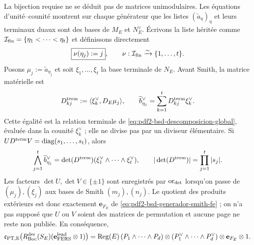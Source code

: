 \begin{proposition}
La bijection requise ne se déduit pas de matrices unimodulaires. Les
équations d'unité--counité montrent sur chaque générateur que les listes
$(\widetilde a_\eta)_\eta$ et leurs terminaux duaux sont des bases de $M_E$ et
$N_E^\vee$. Écrivons la liste héritée comme
$\mathcal I_{\rm fin}=\{\eta_1<\cdots<\eta_t\}$ et définissons directement
\begin{equation}\label{eq:pdf2-bsd-nu-construida}
 \boxed{\nu(\eta_j):=j},
 \qquad
 \nu:\mathcal I_{\rm fin}\xrightarrow{\sim}\{1,\ldots,t\}.
\end{equation}
Posons $\mu_j:=\widetilde a_{\eta_j}$ et soit
$\xi_1,\ldots,\xi_t$ la base terminale de $N_E$. Avant Smith, la matrice
matérielle est
\begin{equation}\label{eq:pdf2-bsd-c2-filas-finitas}
 D^{\rm term}_{kj}:=
 \langle\xi_k^\vee,D_E\mu_j\rangle,
 \qquad
 \widetilde b_{\eta_j}^\vee
 =\sum_{k=1}^tD^{\rm term}_{kj}\xi_k^\vee.
\end{equation}
Cette égalité est la relation terminale de
\eqref{eq:pdf2-bsd-descomposicion-global}, évaluée dans la counité
$\xi_k^\vee$ ; elle ne divise pas par un diviseur élémentaire. Si
$UD^{\rm term}V=\operatorname{diag}(s_1,\ldots,s_t)$, alors
\begin{equation}\label{eq:pdf2-bsd-cuna-smith-con-uv}
 \bigwedge_{j=1}^t\widetilde b_{\eta_j}^\vee
 =\det(D^{\rm term})
   (\xi_1^\vee\wedge\cdots\wedge\xi_t^\vee),
 \qquad
 |\det(D^{\rm term})|=\prod_{j=1}^t|s_j|.
\end{equation}
Les facteurs $\det U,\det V\in\{\pm1\}$ sont enregistrés par
$\operatorname{or}_{\rm det}$ lorsqu'on passe de $(\mu_j),(\xi_j)$ aux bases de
Smith $(m_j),(n_j)$. Le quotient des produits extérieurs est donc exactement
$\mathbf e_{F_E}$ de \eqref{eq:pdf2-bsd-generador-smith-fe} ; on n'a pas
supposé que $U$ ou $V$ soient des matrices de permutation et aucune page
ne reste non publiée. En
conséquence,
\begin{equation}\label{eq:pdf2-bsd-c2-generadores}
 \mathfrak c_{{\rm PT},\mathbb R}
 \bigl(R_{\rm Boc}^{\rm der}(S_E)
       (\mathbf e_{\rm FERS}^{\rm lead}\otimes1)\bigr)
 =\operatorname{Reg}(E)\,
  (P_1\wedge\cdots\wedge P_d)\otimes
  (P_1^\vee\wedge\cdots\wedge P_d^\vee)
  \otimes\mathbf e_{F_E}\otimes1.
\end{equation}


\end{proposition}
